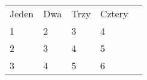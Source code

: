 \begin{table}[H]
\centering
\begin{tabular}{|l|l|l|l|l}
\cline{1-4}
Jeden & Dwa & Trzy & Cztery &  \\ \cline{1-4}
1     & 2   & 3    & 4      &  \\ \cline{1-4}
2     & 3   & 4    & 5      &  \\ \cline{1-4}
3     & 4   & 5    & 6      &  \\ \cline{1-4}
\end{tabular}
\end{table}